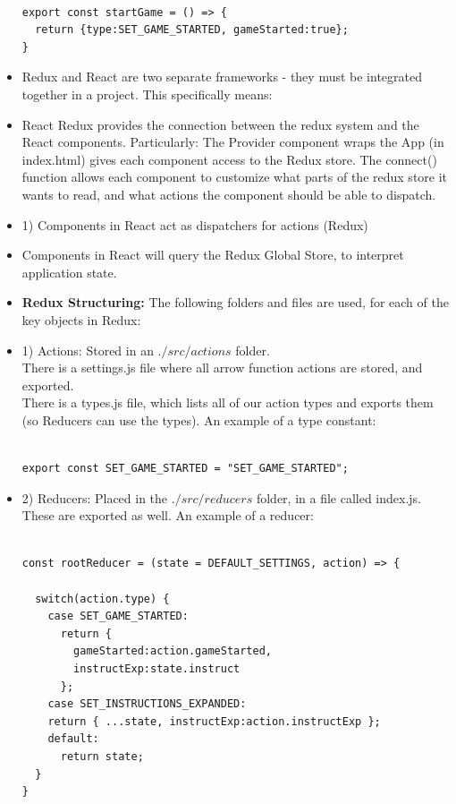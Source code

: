 \documentclass[8pt,a4paper]{extarticle}
\begin{document}
\begin{itemize}
\begin{verbatim}

export const startGame = () => {
  return {type:SET_GAME_STARTED, gameStarted:true};
}

\end{verbatim}

\item Redux and React are two separate frameworks - they must be integrated together in a project. This specifically means: 
\item React Redux provides the connection between the redux system and the React components. Particularly: 
\mitem The Provider component wraps the App (in index.html) gives each component access to the Redux store.
\mitem The connect() function allows each component to customize what parts of the redux store it wants to read, and what actions the component should be able to dispatch.
\item 1) Components in React act as dispatchers for actions (Redux)
\item Components in React will query the Redux Global Store, to interpret application state.
\item \textbf{Redux Structuring:} The following folders and files are used, for each of the key objects in Redux:
\item 1) Actions: Stored in an $./src/actions$ folder. \\

There is a settings.js file where all arrow function actions are stored, and exported.\\

There is a types.js file, which lists all of our action types and exports them (so Reducers can use the types). An example of a type constant:

\begin{verbatim}

export const SET_GAME_STARTED = "SET_GAME_STARTED";

\end{verbatim}

\item 2) Reducers: Placed in the $./src/reducers$ folder, in a file called index.js. These are exported as well. An example of a reducer:

\begin{verbatim}

const rootReducer = (state = DEFAULT_SETTINGS, action) => {
 
  switch(action.type) { 
    case SET_GAME_STARTED:
      return {
        gameStarted:action.gameStarted,
        instructExp:state.instruct
      }; 
    case SET_INSTRUCTIONS_EXPANDED:       
    return { ...state, instructExp:action.instructExp };
    default:
      return state;
  }
}


\end{verbatim}
\end{itemize}
\end{document}
